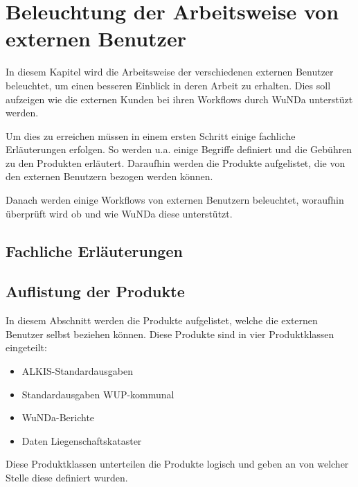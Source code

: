 \chapter{Beleuchtung der Arbeitsweise von externen Benutzer}

In diesem Kapitel wird die Arbeitsweise der verschiedenen externen Benutzer beleuchtet, um einen besseren Einblick in deren Arbeit zu erhalten.
Dies soll aufzeigen wie die externen Kunden bei ihren Workflows durch \ac{WuNDa} unterstüzt werden.

Um dies zu erreichen müssen in einem ersten Schritt einige fachliche Erläuterungen erfolgen. So werden u.a. einige Begriffe definiert und die Gebühren zu den Produkten erläutert. Daraufhin  werden die Produkte aufgelistet, die von den externen Benutzern bezogen werden können.

Danach werden einige Workflows von externen Benutzern beleuchtet, woraufhin überprüft wird ob und wie \ac{WuNDa} diese unterstützt.


\section{Fachliche Erläuterungen}

\section{Auflistung der Produkte}
In diesem Abschnitt werden die Produkte aufgelistet, welche die externen Benutzer selbst beziehen können. Diese Produkte sind in vier Produktklassen eingeteilt:
\begin{itemize}
	\item ALKIS-Standardausgaben
	\item Standardausgaben WUP-kommunal
	\item WuNDa-Berichte
	\item Daten Liegenschaftskataster
\end{itemize}
Diese Produktklassen unterteilen die Produkte logisch und geben an von welcher Stelle diese definiert wurden. 

